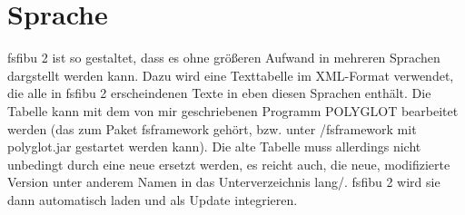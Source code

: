 \documentclass[a4paper,10pt,halfparskip,oneside,smallheadings]{scrbook}
\begin{document}
\section{Sprache}\label{language}
fsfibu 2 ist so gestaltet, dass es ohne größeren Aufwand in mehreren Sprachen dargstellt werden kann. Dazu wird eine Texttabelle im XML-Format verwendet, die alle in fsfibu 2 erscheindenen Texte in eben diesen Sprachen enthält. Die Tabelle kann mit dem von mir geschriebenen Programm POLYGLOT bearbeitet werden (das zum Paket fsframework gehört, bzw. unter /fsframework mit polyglot.jar gestartet werden kann). Die alte Tabelle muss allerdings nicht unbedingt durch eine neue ersetzt werden, es reicht auch, die neue, modifizierte Version unter anderem Namen in das Unterverzeichnis lang/. fsfibu 2 wird sie dann automatisch laden und als Update integrieren.
\end{document}
